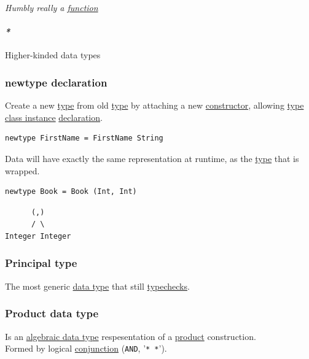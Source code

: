 \documentclass[11pt]{article}
\begin{document}
\emph{Humbly really a \hyperref[orgeb5cddb]{function}}\\

\paragraph{\emph{*}}
\label{sec:org4ff71ca}

\label{org73d55ab}Higher-kinded data types\\

\subsubsection{\label{orgb494af2}newtype declaration}
\label{sec:org9173fa0}
Create a new \hyperref[org4fbaeb8]{type} from old \hyperref[org4fbaeb8]{type} by attaching a new \hyperref[orgd019743]{constructor}, allowing \hyperref[orgb31808e]{type class instance} \hyperref[org56ef1b9]{declaration}.\\
\begin{verbatim}
newtype FirstName = FirstName String
\end{verbatim}

Data will have exactly the same representation at runtime, as the \hyperref[org4fbaeb8]{type} that is wrapped.\\

\begin{verbatim}
newtype Book = Book (Int, Int)
\end{verbatim}
\begin{verbatim}
      (,)
      / \
Integer Integer
\end{verbatim}

\subsubsection{\label{org7a03bef}Principal type}
\label{sec:orgd858ad1}
The most generic \hyperref[org965cde3]{data type} that still \hyperref[org58a3de1]{typechecks}.\\

\subsubsection{\label{orgcbb0d69}Product data type}
\label{sec:orge215577}
Is an \hyperref[orgeba275a]{algebraic data type} respesentation of a \hyperref[orga3d1454]{product} construction.\\
Formed by logical \hyperref[org19fd1b3]{conjunction} (\texttt{AND}, '\texttt{* *}').\\
\end{document}
